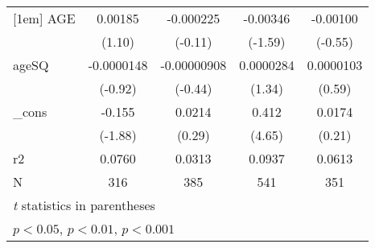 \begin{table}[htbp]
\begin{tabular}{l*{4}{c}}
[1em]
AGE         &     0.00185         &   -0.000225         &    -0.00346         &    -0.00100         \\
            &      (1.10)         &     (-0.11)         &     (-1.59)         &     (-0.55)         \\
[1em]
ageSQ       &  -0.0000148         & -0.00000908         &   0.0000284         &   0.0000103         \\
            &     (-0.92)         &     (-0.44)         &      (1.34)         &      (0.59)         \\
[1em]
\_cons      &      -0.155         &      0.0214         &       0.412\sym{***}&      0.0174         \\
            &     (-1.88)         &      (0.29)         &      (4.65)         &      (0.21)         \\
\hline
r2          &      0.0760         &      0.0313         &      0.0937         &      0.0613         \\
N           &         316         &         385         &         541         &         351         \\
\hline\hline
\multicolumn{5}{l}{\footnotesize \textit{t} statistics in parentheses}\\
\multicolumn{5}{l}{\footnotesize \sym{*} \(p<0.05\), \sym{**} \(p<0.01\), \sym{***} \(p<0.001\)}\\
\end{tabular}
\end{table}
